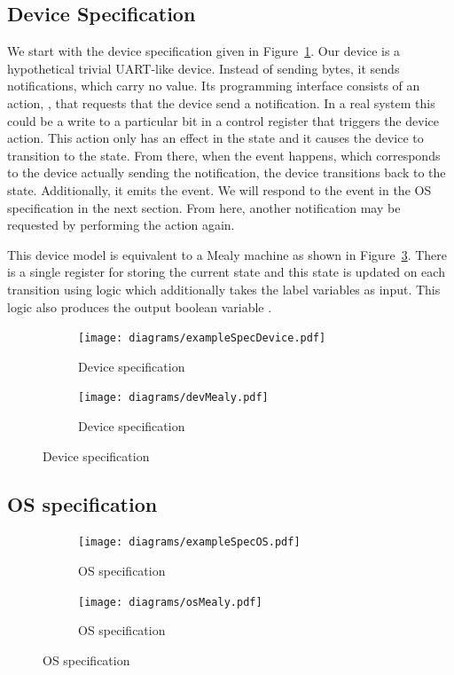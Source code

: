 \subsection{Device Specification}

We start with the device specification given in Figure~\ref{fig:dev_spec}. Our device is a hypothetical trivial UART-like device. Instead of sending bytes, it sends notifications, which carry no value. Its programming interface consists of an action, , that requests that the device send a notification. In a real system this could be a write to a particular bit in a control register that triggers the device action. This action only has an effect in the  state and it causes the device to transition to the  state. From there, when the  event happens, which corresponds to the device actually sending the notification, the device transitions back to the  state. Additionally, it emits the  event. We will respond to the  event in the OS specification in the next section. From here, another notification may be requested by performing the  action again.

This device model is equivalent to a Mealy machine as shown in Figure~\ref{fig:dev_spec_mealy}. There is a single register for storing the current state and this state is updated on each transition using logic which additionally takes the label variables as input. This logic also produces the output boolean variable .

\begin{figure}
\centering
\begin{subfigure}[t]{0.47\textwidth}
\texttt{[image: diagrams/exampleSpecDevice.pdf]}
\caption{Device specification}
\label{fig:dev_spec}
\end{subfigure}
\hfill
\begin{subfigure}[t]{0.47\textwidth}
\texttt{[image: diagrams/devMealy.pdf]}
\caption{Device specification}
\label{fig:dev_spec_mealy}
\end{subfigure}
\end{figure}

\subsection{OS specification}

\begin{figure}
\centering
\begin{subfigure}[t]{0.47\textwidth}
\texttt{[image: diagrams/exampleSpecOS.pdf]}
\caption{OS specification}
\label{fig:os_spec}
\end{subfigure}
\hfill
\begin{subfigure}[t]{0.47\textwidth}
\centering
\texttt{[image: diagrams/osMealy.pdf]}
\caption{OS specification}
\label{fig:os_spec_mealy}
\end{subfigure}
\end{figure}

